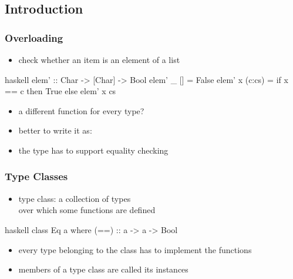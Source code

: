 \documentclass[dvipsnames]{beamer}
\theoremstyle{plain}
\begin{document}
\subsection{Introduction}

\begin{frame}[fragile]
  \frametitle{Overloading}

  \begin{itemize}
    \item check whether an item is an element of a list
  \end{itemize}

  \begin{exampleblock}{}
    \begin{pygments}{haskell}
elem' :: Char -> [Char] -> Bool
elem' _ []     = False
elem' x (c:cs) = if x == c then True else elem' x cs
    \end{pygments}
  \end{exampleblock}

  \pause
  \begin{itemize}
    \item a different function for every type?
    \item better to write it as:\\
    \item the type has to support equality checking
  \end{itemize}
\end{frame}

\begin{frame}[fragile]
  \frametitle{Type Classes}

  \begin{itemize}
    \item \alert{type class}: a collection of types\\
      over which some functions are defined
  \end{itemize}

  \begin{exampleblock}{}
    \begin{pygments}{haskell}
class Eq a where
  (==) :: a -> a -> Bool
    \end{pygments}
  \end{exampleblock}

  \pause
  \begin{itemize}
    \item every type belonging to the class has to implement the functions
    \item members of a type class are called its \alert{instances}
  \end{itemize}
\end{frame}
\end{document}
